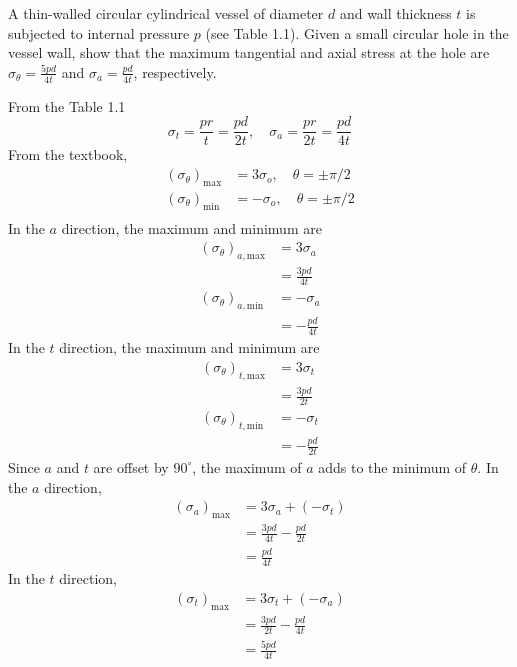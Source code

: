 \section{}
A thin-walled circular cylindrical vessel of diameter $d$ and wall thickness $t$ is subjected to internal pressure $p$ (see Table 1.1).
Given a small circular hole in the vessel wall, show that the maximum tangential and axial stress at the hole are $\sigma_{\theta}
= \frac{5pd}{4t}$ and $\sigma_{a} = \frac{pd}{4t}$, respectively.

From the Table 1.1
\begin{equation*}
    \sigma_{t} = \frac{pr}{t} = \frac{pd}{2t}, \quad \sigma_{a} = \frac{pr}{2t} = \frac{pd}{4t}
\end{equation*}
From the textbook,
\begin{align*}
    (\sigma_{\theta})_{\text{max}} &= 3 \sigma_o, \quad \theta = \pm \pi/2 \\
    (\sigma_{\theta})_{\text{min}} &= -\sigma_o, \quad \theta = \pm \pi/2 \\
\end{align*}
In the $a$ direction, the maximum and minimum are
\begin{align*}
    (\sigma_{\theta})_{a, \text{max}} &= 3 \sigma_a \\
    &= \frac{3pd}{4t} \\
    (\sigma_{\theta})_{a, \text{min}} &= -\sigma_a \\
    &= -\frac{pd}{4t}
\end{align*}
In the $t$ direction, the maximum and minimum are
\begin{align*}
    (\sigma_{\theta})_{t, \text{max}} &= 3 \sigma_{t} \\
    &= \frac{3pd}{2t} \\
    (\sigma_{\theta})_{t, \text{min}} &= -\sigma_{t} \\
    &= -\frac{pd}{2t}
\end{align*}
Since $a$ and $t$ are offset by $90^\circ$, the maximum of $a$ adds to the minimum of $\theta$. In the 
$a$ direction, 
\begin{align*}
    (\sigma_{a})_{\text{max}} &= 3 \sigma_a + (-\sigma_t) \\
    &= \frac{3pd}{4t} - \frac{pd}{2t} \\
    &= \boxed{\frac{pd}{4t}}
\end{align*}
In the $t$ direction,
\begin{align*}
    (\sigma_{t})_{\text{max}} &= 3 \sigma_t + (-\sigma_a) \\
    &= \frac{3pd}{2t} - \frac{pd}{4t} \\
    &= \boxed{\frac{5pd}{4t}}
\end{align*}